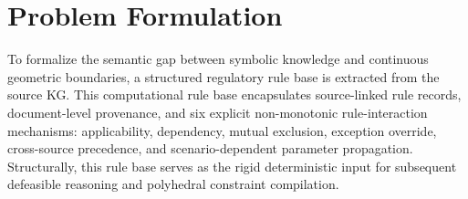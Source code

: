 ﻿\documentclass[a4paper,fleqn]{cas-dc}
\begin{document}
\section{Problem Formulation}
\label{sec:problem}

To formalize the semantic gap between symbolic knowledge and continuous geometric boundaries, a structured regulatory rule base is extracted from the source KG. This computational rule base encapsulates source-linked rule records, document-level provenance, and six explicit non-monotonic rule-interaction mechanisms: applicability, dependency, mutual exclusion, exception override, cross-source precedence, and scenario-dependent parameter propagation. Structurally, this rule base serves as the rigid deterministic input for subsequent defeasible reasoning and polyhedral constraint compilation.
\end{document}
